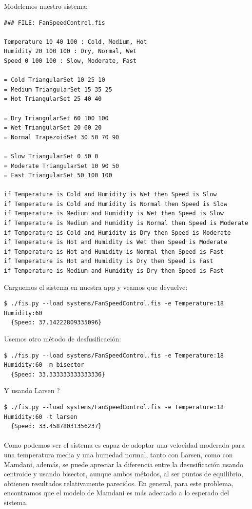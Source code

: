 \documentclass[a4paper, 12pt]{article}
\begin{document}
Modelemos nuestro sistema:

\begin{verbatim}
### FILE: FanSpeedControl.fis

Temperature 10 40 100 : Cold, Medium, Hot
Humidity 20 100 100 : Dry, Normal, Wet
Speed 0 100 100 : Slow, Moderate, Fast

= Cold TriangularSet 10 25 10
= Medium TriangularSet 15 35 25
= Hot TriangularSet 25 40 40

= Dry TriangularSet 60 100 100
= Wet TriangularSet 20 60 20
= Normal TrapezoidSet 30 50 70 90

= Slow TriangularSet 0 50 0
= Moderate TriangularSet 10 90 50
= Fast TriangularSet 50 100 100

if Temperature is Cold and Humidity is Wet then Speed is Slow
if Temperature is Cold and Humidity is Normal then Speed is Slow
if Temperature is Medium and Humidity is Wet then Speed is Slow
if Temperature is Medium and Humidity is Normal then Speed is Moderate
if Temperature is Cold and Humidity is Dry then Speed is Moderate
if Temperature is Hot and Humidity is Wet then Speed is Moderate
if Temperature is Hot and Humidity is Normal then Speed is Fast
if Temperature is Hot and Humidity is Dry then Speed is Fast
if Temperature is Medium and Humidity is Dry then Speed is Fast
\end{verbatim}

Carguemos el sistema en nuestra app y veamos que devuelve:

\begin{verbatim}
$ ./fis.py --load systems/FanSpeedControl.fis -e Temperature:18 Humidity:60
  {Speed: 37.14222809335096}
\end{verbatim}

Usemos otro m\'etodo de desfusificaci\'on:
\begin{verbatim}
$ ./fis.py --load systems/FanSpeedControl.fis -e Temperature:18 Humidity:60 -m bisector
  {Speed: 33.333333333333336}
\end{verbatim}

Y usando Larsen ?

\begin{verbatim}
$ ./fis.py --load systems/FanSpeedControl.fis -e Temperature:18 Humidity:60 -t larsen
  {Speed: 33.45878031356237}
\end{verbatim}

\paragraph{}
Como podemos ver el sistema es capaz de adoptar una velocidad moderada para una temperatura
media y una humedad normal, tanto con Larsen, como con Mamdani, adem\'as, se puede apreciar la
diferencia entre la desusificaci\'on usando centroide y usando bisector, aunque ambos m\'etodos, al
ser puntos de equilibrio, obtienen resultados relativamente parecidos. En general, para este problema,
encontramos que el modelo de Mamdani es m\'as adecuado a lo esperado del sistema. 
\end{document}
